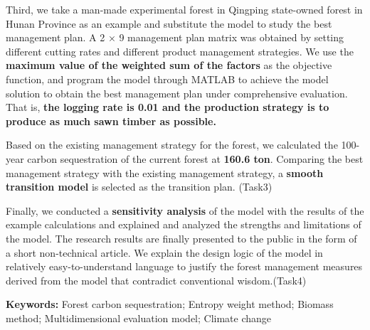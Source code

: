 \documentclass[12pt]{article}
\begin{document}
Third, we take a man-made experimental forest in Qingping state-owned forest in Hunan Province as an example and substitute the model to study the best management plan. A 2 × 9 management plan matrix was obtained by setting different cutting rates and different product management strategies. We use the \textbf{maximum value of the weighted sum of the factors} as the objective function, and program the model through MATLAB to achieve the model solution to obtain the best management plan under comprehensive evaluation. That is, \textbf{the logging rate is 0.01 and the production strategy is to produce as much sawn timber as possible.}

Based on the existing management strategy for the forest, we calculated the 100-year carbon sequestration of the current forest at \textbf{160.6 ton}. Comparing the best management strategy with the existing management strategy, a \textbf{smooth transition model} is selected as the transition plan. (Task3)

Finally, we conducted a \textbf{sensitivity analysis} of the model with the results of the example calculations and explained and analyzed the strengths and limitations of the model. The research results are finally presented to the public in the form of a short non-technical article. We explain the design logic of the model in relatively easy-to-understand language to justify the forest management measures derived from the model that contradict conventional wisdom.(Task4)

  \bigskip
  
\textbf{Keywords:}{ Forest carbon sequestration; Entropy weight method; Biomass method; Multidimensional evaluation model; Climate change }


\clearpage
\pagestyle{fancy}
\newpage
\setcounter{page}{1}
\tableofcontents





















\end{document}
